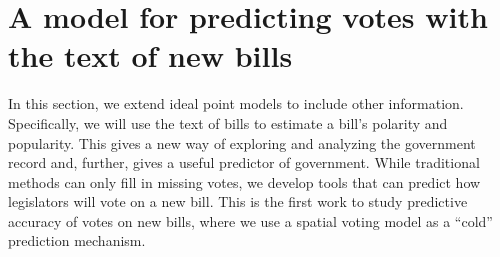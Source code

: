 





\section{A model for predicting votes with the text of new bills}
 
In this section, we extend ideal point models to include other
information.  Specifically, we will use the text of bills to estimate
a bill's polarity and popularity.  This gives a new way of exploring
and analyzing the government record and, further, gives a useful
predictor of government.  While traditional methods can only fill in
missing votes, we develop tools that can predict how legislators will
vote on a new bill. This is the first work to study predictive
accuracy of votes on new bills, where we use a spatial voting model as
a ``cold'' prediction mechanism.

